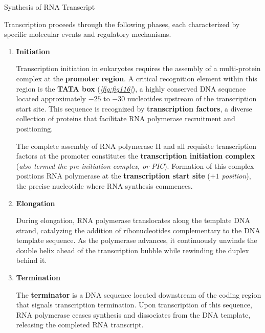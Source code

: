 \documentclass[10pt]{article}
\begin{document}
    \begin{core}[label=core:transcription]{Synthesis of RNA Transcript}

      Transcription proceeds through the following phases, each characterized by specific molecular events and regulatory mechanisms.

      \begin{enumerate}

        \item \textbf{Initiation}


        Transcription initiation in eukaryotes requires the assembly of a multi-protein complex at the \textbf{promoter region}. A critical recognition element within this region is the \textbf{TATA box} (\textit{\autoref{fig:fig116}}), a highly conserved DNA sequence located approximately $-25$ to $-30$ nucleotides upstream of the transcription start site. This sequence is recognized by \textbf{transcription factors}, a diverse collection of proteins that facilitate RNA polymerase recruitment and positioning.

        
        The complete assembly of RNA polymerase II and all requisite transcription factors at the promoter constitutes the \textbf{transcription initiation complex} (\textit{also termed the pre-initiation complex, or PIC}). Formation of this complex positions RNA polymerase at the \textbf{transcription start site} (\textit{$+1$ position}), the precise nucleotide where RNA synthesis commences.

        \item \textbf{Elongation}

        
        During elongation, RNA polymerase translocates along the template DNA strand, catalyzing the addition of ribonucleotides complementary to the DNA template sequence. As the polymerase advances, it continuously unwinds the double helix ahead of the transcription bubble while rewinding the duplex behind it.         

        \item \textbf{Termination}

        The \textbf{terminator} is a DNA sequence located downstream of the coding region that signals transcription termination. Upon transcription of this sequence, RNA polymerase ceases synthesis and dissociates from the DNA template, releasing the completed RNA transcript.


\end{enumerate}
\end{core}
\end{document}
